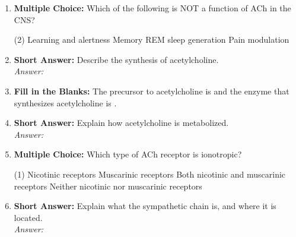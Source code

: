 \begin{enumerate}[label=\textbf{Q3.4.\arabic*}]
    \item \textbf{Multiple Choice:} Which of the following is NOT a function of ACh in the CNS?
        \begin{tasks}[label=\textcolor{\documentTheme}{(\Alph*)}, item-format=\color{\documentTheme}, label-width=1.5em, item-indent=1.7em](2)
            \task Learning and alertness
            \task Memory
            \task REM sleep generation
            \task Pain modulation
        \end{tasks}

    \item \textbf{Short Answer:} Describe the synthesis of acetylcholine. \\
        \textit{Answer:} \\%

    \item \textbf{Fill in the Blanks:} The precursor to acetylcholine is \underline{\hspace{3cm}} and the enzyme that synthesizes acetylcholine is \underline{\hspace{3cm}}.

    \item \textbf{Short Answer:} Explain how acetylcholine is metabolized. \\
        \textit{Answer:} \\%

    \item \textbf{Multiple Choice:} Which type of ACh receptor is ionotropic?
        \begin{tasks}[label=\textcolor{\documentTheme}{(\Alph*)}, item-format=\color{\documentTheme}, label-width=1.5em, item-indent=1.7em](1)
            \task Nicotinic receptors
            \task Muscarinic receptors
            \task Both nicotinic and muscarinic receptors
            \task Neither nicotinic nor muscarinic receptors
        \end{tasks}

    \item \textbf{Short Answer:} Explain what the sympathetic chain is, and where it is located. \\
        \textit{Answer:} %


\end{enumerate}
